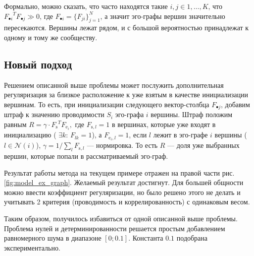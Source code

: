 \documentclass{ITaSconf}
\begin{document}
	
	Формально, можно сказать, что часто находятся такие $i,j \in {1,\dots, K}$, что ${F_{\bullet i}}^T F_{\bullet j} \gg 0$, где $F_{\bullet i} = \{F_{j i}\}_{j=1}^N$, а значит эго-графы вершин значительно пересекаются. 
	Вершины лежат рядом, и с большой вероятностью принадлежат к одному и тому же сообществу.
	
	\subsection{Новый подход}
	
	Решением описанной выше проблемы может послужить дополнительная регуляризация за близкое расположение к уже взятым в качестве инициализации вершинам. 
	То есть, при инициализации следующего вектор-столбца $F_{\bullet j}$, добавим штраф к значению проводимости $S_i$ эго-графа $i$ вершины. Штраф положим равным 
	$R = \gamma \cdot {F_{\mathrm{s}}}^T F_{\mathrm{e}_i},$
	где $F_{\mathrm{s}, l} = 1$ в вершинах, которые уже входят в инициализацию ( $\exists k:\, F_{lk}=1 $),
	а $F_{\mathrm{e}_i, l} = 1$, если $l$ лежит в эго-графе $i$ вершины ($l \in \mathcal{N}(i)$),
	$\gamma = 1 / \sum_l F_{\mathrm{s}, l}$ --- нормировка. 
	То есть $R$ --- доля уже выбранных вершин, которые попали в рассматриваемый эго-граф.
	
	Результат работы метода на текущем примере отражен на правой части рис. \ref{fig:model_ex_graph}. Желаемый результат достигнут. Для большей общности можно ввести коэффициент регуляризации, но было решено этого не делать и учитывать 2 критерия (проводимость и коррелированность) с одинаковым весом. 
	
	Таким образом, получилось избавиться от одной описанной выше проблемы. 
	Проблема нулей и детерминированности решается простым добавлением равномерного шума в диапазоне $[0; 0.1]$. Константа $0.1$ подобрана экспериментально. 
	
\end{document}
